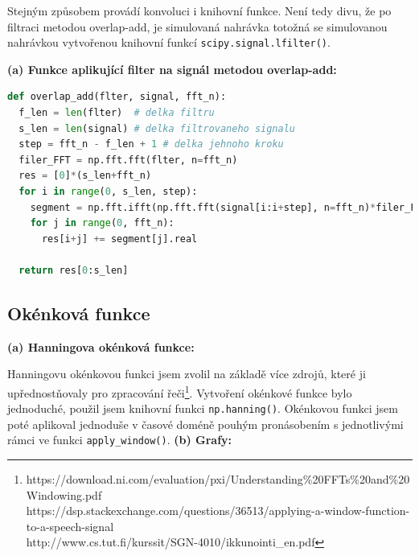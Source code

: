 \documentclass[12pt]{article}
\begin{document}
\hspace{1.5em}Stejným způsobem provádí konvoluci i knihovní funkce. Není tedy divu, že po filtraci metodou overlap-add, je simulovaná nahrávka totožná se simulovanou nahrávkou vytvořenou knihovní funkcí \texttt{scipy.signal.lfilter()}.

\vspace{1em}
\textbf{(a) Funkce aplikující filter na signál metodou overlap-add:}

\begin{lstlisting}[language=Python]
def overlap_add(flter, signal, fft_n):
  f_len = len(flter)  # delka filtru
  s_len = len(signal) # delka filtrovaneho signalu
  step = fft_n - f_len + 1 # delka jehnoho kroku
  filer_FFT = np.fft.fft(flter, n=fft_n)
  res = [0]*(s_len+fft_n)
  for i in range(0, s_len, step):
    segment = np.fft.ifft(np.fft.fft(signal[i:i+step], n=fft_n)*filer_FFT)
    for j in range(0, fft_n):
      res[i+j] += segment[j].real
    
  return res[0:s_len]
\end{lstlisting}
\subsection{Okénková funkce}
\textbf{(a) Hanningova okénková funkce:}

\hspace{1.5em}Hanningovu okénkovou funkci jsem zvolil na základě více zdrojů, které ji upřednostňovaly pro zpracování řeči\footnote[3]{https://download.ni.com/evaluation/pxi/Understanding\%20FFTs\%20and\%20Windowing.pdf\\ https://dsp.stackexchange.com/questions/36513/applying-a-window-function-to-a-speech-signal\\ http://www.cs.tut.fi/kurssit/SGN-4010/ikkunointi\_en.pdf}. Vytvoření okénkové funkce bylo jednoduché, použil jsem knihovní funkci \texttt{np.hanning()}. Okénkovou funkci jsem poté aplikoval jednoduše v časové doméně pouhým pronásobením s jednotlivými rámci ve funkci \texttt{apply\_window()}.
\newpage
\textbf{(b) Grafy:}
\end{document}
